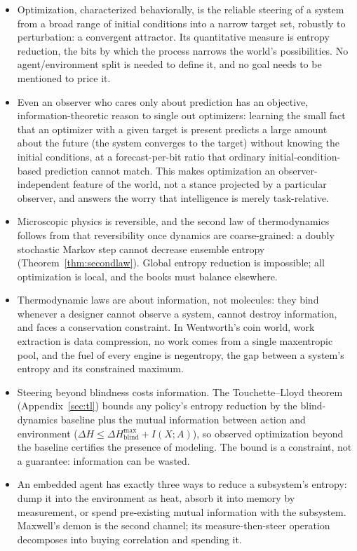 \documentclass[10pt]{article}
\theoremstyle{definition}
\theoremstyle{remark}
\begin{document}
\begin{itemize}[leftmargin=2em]
  \item Optimization, characterized behaviorally, is the reliable steering of a system from a broad range of initial conditions into a narrow target set, robustly to perturbation: a convergent attractor. Its quantitative measure is entropy reduction, the bits by which the process narrows the world's possibilities. No agent/environment split is needed to define it, and no goal needs to be mentioned to price it.
  \item Even an observer who cares only about prediction has an objective, information-theoretic reason to single out optimizers: learning the small fact that an optimizer with a given target is present predicts a large amount about the future (the system converges to the target) without knowing the initial conditions, at a forecast-per-bit ratio that ordinary initial-condition-based prediction cannot match. This makes optimization an observer-independent feature of the world, not a stance projected by a particular observer, and answers the worry that intelligence is merely task-relative.
  \item Microscopic physics is reversible, and the second law of thermodynamics follows from that reversibility once dynamics are coarse-grained: a doubly stochastic Markov step cannot decrease ensemble entropy (Theorem~\ref{thm:secondlaw}). Global entropy reduction is impossible; all optimization is local, and the books must balance elsewhere.
  \item Thermodynamic laws are about information, not molecules: they bind whenever a designer cannot observe a system, cannot destroy information, and faces a conservation constraint. In Wentworth's coin world, work extraction is data compression, no work comes from a single maxentropic pool, and the fuel of every engine is negentropy, the gap between a system's entropy and its constrained maximum.
  \item Steering beyond blindness costs information. The Touchette--Lloyd theorem (Appendix~\ref{sec:tl}) bounds any policy's entropy reduction by the blind-dynamics baseline plus the mutual information between action and environment ($\Delta H \le \Delta H^{\max}_{\mathrm{blind}} + I(X;A)$), so observed optimization beyond the baseline certifies the presence of modeling. The bound is a constraint, not a guarantee: information can be wasted.
  \item An embedded agent has exactly three ways to reduce a subsystem's entropy: dump it into the environment as heat, absorb it into memory by measurement, or spend pre-existing mutual information with the subsystem. Maxwell's demon is the second channel; its measure-then-steer operation decomposes into buying correlation and spending it.

\end{itemize}
\end{document}
